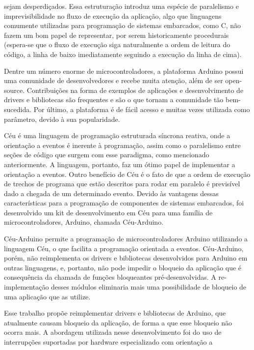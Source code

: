 \documentclass{article}
\begin{document}
sejam desperdiçados. Essa estruturação introduz uma espécie de paralelismo e imprevisibilidade no
fluxo de execução da aplicação, algo que linguagens comumente utilizadas para programação de
sistemas embarcados, como C, não fazem um bom papel de representar, por serem historicamente
procedurais (espera-se que o fluxo de execução siga naturalmente a ordem de leitura do código, a
linha de baixo imediatamente seguindo a execução da linha de cima).
\par Dentre um número enorme de microcontroladores, a plataforma Arduino possui uma comunidade de desenvolvedores e recebe muita atenção, além de ser open-source. Contribuições na forma de
exemplos de aplicações e desenvolvimento de drivers e bibliotecas são frequentes e são o que tornam
a comunidade tão bem-sucedida. Por último, a plataforma é de fácil acesso e muitas vezes utilizada
como parâmetro, devido à sua popularidade. \cite{arduinoblog}
\par Céu é uma linguagem de programação estruturada síncrona reativa, onde a orientação a eventos é
inerente à programação, assim como o paralelismo entre seções de código que surgem com esse
paradigma, como mencionado anteriormente. A linguagem, portanto, faz um ótimo papel de
implementar a orientação a eventos. Outro benefício de Céu é o fato de que a ordem de execução de
trechos de programa que estão descritos para rodar em paralelo é previsível dado a chegada de um
determinado evento. \cite{santanna2012} Devido às vantagens dessas características para a programação de
componentes de sistemas embarcados, foi desenvolvido um kit de desenvolvimento em Céu para
uma família de microcontroladores, Arduino, chamada Céu-Arduino.
\par Céu-Arduino permite a programação de microcontroladores Arduino utilizando a linguagem Céu, o
que facilita a programação orientada a eventos. Céu-Arduino, porém, não reimplementa os drivers e
bibliotecas desenvolvidos para Arduino em outras linguagens, e, portanto, não pode impedir o
bloqueio da aplicação que é consequência da chamada de funções bloqueantes pré-desenvolvidas. A
re-implementação desses módulos eliminaria mais uma possibilidade de bloqueio de uma aplicação
que as utilize. \cite{githubceuarduino}
\par Esse trabalho propõe reimplementar drivers e bibliotecas de Arduino, que atualmente causam
bloqueio da aplicação, de forma a que esse bloqueio não ocorra mais. A abordagem utilizada nesse
desenvolvimento foi do uso de interrupções suportadas por hardware especializado com orientação a
\end{document}
